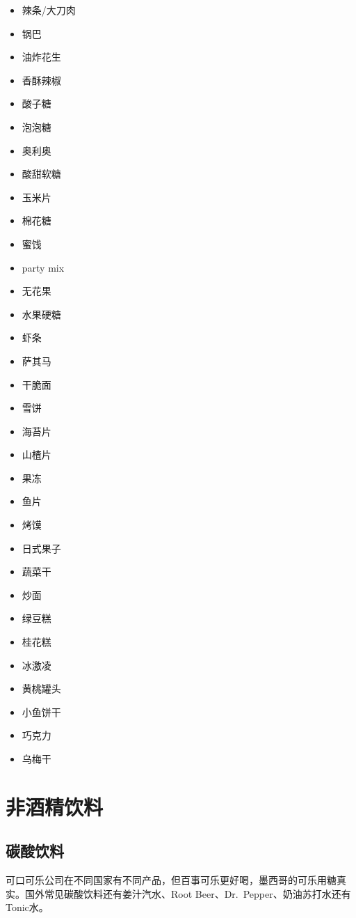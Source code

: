\documentclass[
  letterpaper,
  DIV=11,
  numbers=noendperiod]{scrreprt}
\providecommand{\tightlist}{%
  \setlength{\itemsep}{0pt}\setlength{\parskip}{0pt}}\usepackage{longtable,booktabs,array}
\begin{document}
\begin{itemize}
\tightlist
\item
  辣条/大刀肉
\item
  锅巴
\item
  油炸花生
\item
  香酥辣椒
\item
  酸子糖
\item
  泡泡糖
\item
  奥利奥
\item
  酸甜软糖
\item
  玉米片
\item
  棉花糖
\item
  蜜饯
\item
  party mix
\item
  无花果
\item
  水果硬糖
\item
  虾条
\item
  萨其马
\item
  干脆面
\item
  雪饼
\item
  海苔片
\item
  山楂片
\item
  果冻
\item
  鱼片
\item
  烤馍
\item
  日式果子
\item
  蔬菜干
\item
  炒面
\item
  绿豆糕
\item
  桂花糕
\item
  冰激凌
\item
  黄桃罐头
\item
  小鱼饼干
\item
  巧克力
\item
  乌梅干
\end{itemize}

\section{非酒精饮料}\label{ux975eux9152ux7cbeux996eux6599}

\subsection{碳酸饮料}\label{ux78b3ux9178ux996eux6599}

可口可乐公司在不同国家有不同产品，但百事可乐更好喝，墨西哥的可乐用糖真实。国外常见碳酸饮料还有姜汁汽水、Root
Beer、Dr.~Pepper、奶油苏打水还有Tonic水。
\end{document}
